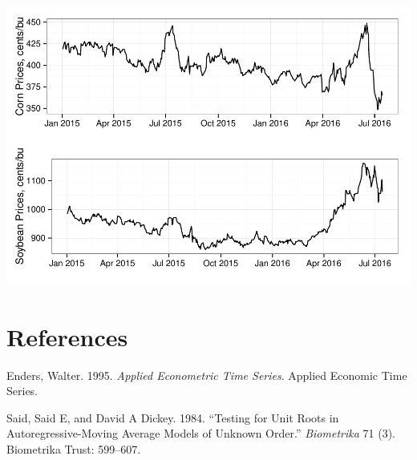 \documentclass[]{elsarticle} %
\makeatletter
\def\maxwidth{\ifdim\Gin@nat@width>\linewidth\linewidth
\else\Gin@nat@width\fi}
\let\Oldincludegraphics\includegraphics
\renewcommand{\includegraphics}[1]{\Oldincludegraphics[width=\maxwidth]{#1}}
\makeatother
\begin{document}
\includegraphics{manuscript-example_files/figure-latex/unnamed-chunk-4-1.pdf}

\clearpage

\section*{References}\label{references}

Enders, Walter. 1995. \emph{Applied Econometric Time Series}. Applied
Economic Time Series.

Said, Said E, and David A Dickey. 1984. ``Testing for Unit Roots in
Autoregressive-Moving Average Models of Unknown Order.''
\emph{Biometrika} 71 (3). Biometrika Trust: 599--607.
\end{document}
